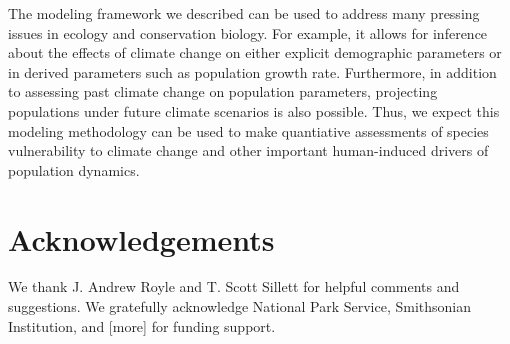\documentclass[12pt]{article}
\begin{document}
The modeling framework we described can be used to address many
pressing issues in ecology and conservation biology. For
example,
it allows for inference %
about the effects of climate change on either explicit
demographic parameters or in derived parameters such as
population growth rate. Furthermore, %
in addition to assessing past climate change on population
parameters, projecting populations under future climate scenarios is also
possible. Thus, we expect this modeling methodology can be used
to make quantiative assessments of species vulnerability to climate
change and other important human-induced drivers of population
dynamics.


\section{Acknowledgements}

We thank J. Andrew Royle and T. Scott Sillett for helpful
comments and suggestions. We gratefully acknowledge National Park 
Service, Smithsonian Institution, and [more] for funding support.




\newpage

\end{document}
